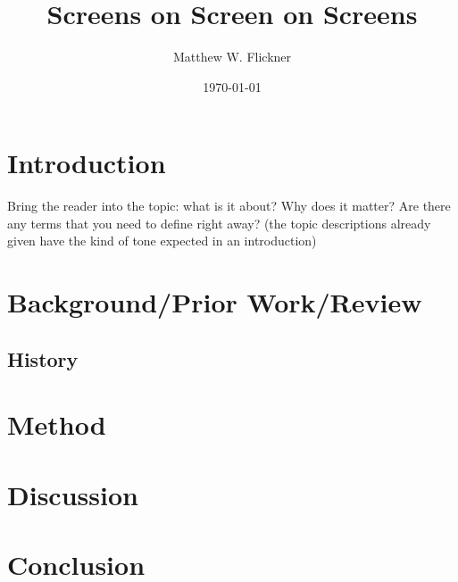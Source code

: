 \documentclass[a4paper]{article}
\title{Screens on Screen on Screens}
\author{Matthew W. Flickner}
\date{\today}
\begin{document}
\maketitle

\begin{abstract}
\end{abstract}

\section{Introduction}

Bring the reader into the topic: 
what is it about? Why does it matter? Are there 
any terms that you need to define right away? 
(the topic descriptions already given have the 
kind of tone expected in an introduction)

\section{Background/Prior Work/Review}
\label{sec:examples}

\subsection{History}

\section{Method}
\section{Discussion}
\section{Conclusion}
\end{document}
